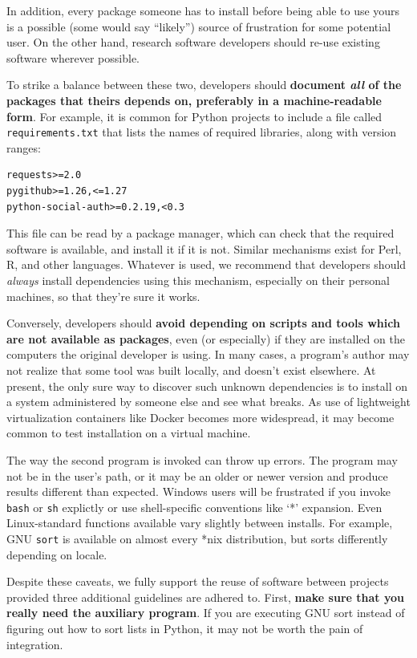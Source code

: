 \documentclass[10pt,letterpaper]{article}
\begin{document}
In addition, every package someone has to install
before being able to use yours is a
possible (some would say ``likely'') source of frustration for some
potential user. On the other hand, research software developers should
re-use existing software wherever possible.

To strike a balance between
these two, developers should
\textbf{document \emph{all} of the packages that theirs depends on, preferably in a machine-readable form}.
For example, it is common for Python projects to include a file called
\texttt{requirements.txt} that lists the names of required libraries,
along with version ranges:

\begin{verbatim}
requests>=2.0
pygithub>=1.26,<=1.27
python-social-auth>=0.2.19,<0.3
\end{verbatim}

This file can be read by a package manager, which can check that the
required software is available, and install it if it is not. Similar
mechanisms exist for Perl, R, and other languages.  Whatever is used,
we recommend that developers should \emph{always} install dependencies
using this mechanism, especially on their personal machines, so that
they're sure it works.

Conversely, developers should
\textbf{avoid depending on scripts and tools which are not available as packages},
even (or especially) if they are installed on the computers the original developer is using.
In many cases, a program's author may not realize that some tool was built locally, and
doesn't exist elsewhere. At present, the only sure way to discover such
unknown dependencies is to install on a system administered by someone
else and see what breaks. As use of lightweight
virtualization containers like Docker becomes more widespread, it may
become common to test installation on a virtual machine.

The way the second program is invoked can throw up errors.
The program may not be in the user's path, or it may be an
older or newer version and produce results different than expected.
Windows users will be frustrated if you invoke \texttt{bash} or \texttt{sh} explictly or
use shell-specific conventions like `*' expansion.
Even Linux-standard functions available vary slightly between
installs. For example, GNU \texttt{sort} is available on almost every
*nix distribution, but sorts differently depending on locale.

Despite these caveats,
we fully support the reuse of software between projects provided
three additional guidelines are adhered to. First, 
\textbf{make sure that you really need the auxiliary program}. If you are
executing GNU sort instead of figuring out how to sort lists in Python,
it may not be worth the pain of integration.
\end{document}
